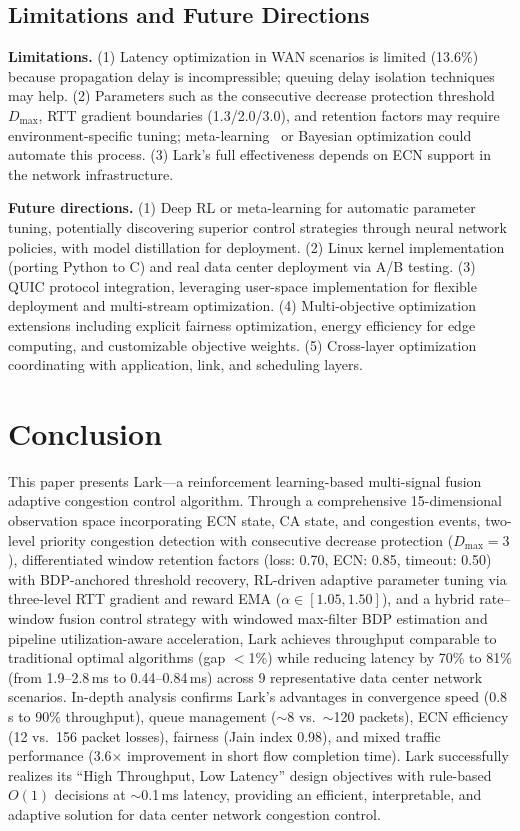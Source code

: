 \documentclass[10pt,twocolumn]{article}
\begin{document}
\subsection{Limitations and Future Directions}

\textbf{Limitations.} (1) Latency optimization in WAN scenarios is limited (13.6\%) because propagation delay is incompressible; queuing delay isolation techniques may help. (2) Parameters such as the consecutive decrease protection threshold $D_{\max}$, RTT gradient boundaries (1.3/2.0/3.0), and retention factors may require environment-specific tuning; meta-learning~\cite{remy} or Bayesian optimization could automate this process. (3) Lark's full effectiveness depends on ECN support in the network infrastructure.

\textbf{Future directions.} (1) Deep RL or meta-learning for automatic parameter tuning, potentially discovering superior control strategies through neural network policies, with model distillation for deployment. (2) Linux kernel implementation (porting Python to C) and real data center deployment via A/B testing. (3) QUIC protocol integration, leveraging user-space implementation for flexible deployment and multi-stream optimization. (4) Multi-objective optimization extensions including explicit fairness optimization, energy efficiency for edge computing, and customizable objective weights. (5) Cross-layer optimization coordinating with application, link, and scheduling layers.

\section{Conclusion}

This paper presents Lark---a reinforcement learning-based multi-signal fusion adaptive congestion control algorithm. Through a comprehensive 15-dimensional observation space incorporating ECN state, CA state, and congestion events, two-level priority congestion detection with consecutive decrease protection ($D_{\max}=3$), differentiated window retention factors (loss: 0.70, ECN: 0.85, timeout: 0.50) with BDP-anchored threshold recovery, RL-driven adaptive parameter tuning via three-level RTT gradient and reward EMA ($\alpha \in [1.05, 1.50]$), and a hybrid rate--window fusion control strategy with windowed max-filter BDP estimation and pipeline utilization-aware acceleration, Lark achieves throughput comparable to traditional optimal algorithms (gap $<$1\%) while reducing latency by 70\% to 81\% (from 1.9--2.8\,ms to 0.44--0.84\,ms) across 9 representative data center network scenarios. In-depth analysis confirms Lark's advantages in convergence speed (0.8\,s to 90\% throughput), queue management ($\sim$8 vs.\ $\sim$120 packets), ECN efficiency (12 vs.\ 156 packet losses), fairness (Jain index 0.98), and mixed traffic performance (3.6$\times$ improvement in short flow completion time). Lark successfully realizes its ``High Throughput, Low Latency'' design objectives with rule-based $O(1)$ decisions at $\sim$0.1\,ms latency, providing an efficient, interpretable, and adaptive solution for data center network congestion control.
\end{document}
